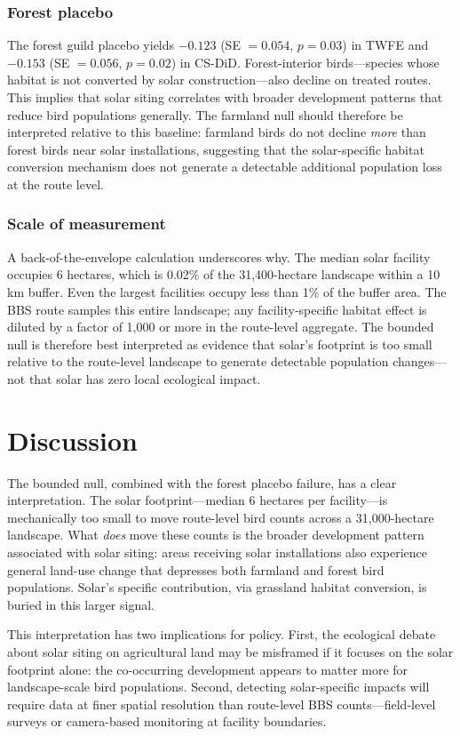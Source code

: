 \documentclass[12pt]{article}
\begin{document}
\subsubsection*{Forest placebo} The forest guild placebo yields $-0.123$ (SE $= 0.054$, $p = 0.03$) in TWFE and $-0.153$ (SE $= 0.056$, $p = 0.02$) in CS-DiD. Forest-interior birds---species whose habitat is not converted by solar construction---also decline on treated routes. This implies that solar siting correlates with broader development patterns that reduce bird populations generally. The farmland null should therefore be interpreted relative to this baseline: farmland birds do not decline \textit{more} than forest birds near solar installations, suggesting that the solar-specific habitat conversion mechanism does not generate a detectable additional population loss at the route level.

\subsubsection*{Scale of measurement} A back-of-the-envelope calculation underscores why. The median solar facility occupies 6 hectares, which is 0.02\% of the 31,400-hectare landscape within a 10 km buffer. Even the largest facilities occupy less than 1\% of the buffer area. The BBS route samples this entire landscape; any facility-specific habitat effect is diluted by a factor of 1,000 or more in the route-level aggregate. The bounded null is therefore best interpreted as evidence that solar's footprint is too small relative to the route-level landscape to generate detectable population changes---not that solar has zero local ecological impact.

\section{Discussion}

The bounded null, combined with the forest placebo failure, has a clear interpretation. The solar footprint---median 6 hectares per facility---is mechanically too small to move route-level bird counts across a 31,000-hectare landscape. What \textit{does} move these counts is the broader development pattern associated with solar siting: areas receiving solar installations also experience general land-use change that depresses both farmland and forest bird populations. Solar's specific contribution, via grassland habitat conversion, is buried in this larger signal.

This interpretation has two implications for policy. First, the ecological debate about solar siting on agricultural land may be misframed if it focuses on the solar footprint alone: the co-occurring development appears to matter more for landscape-scale bird populations. Second, detecting solar-specific impacts will require data at finer spatial resolution than route-level BBS counts---field-level surveys or camera-based monitoring at facility boundaries.
\end{document}
